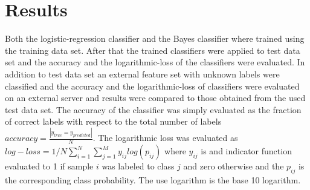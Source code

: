 \documentclass[aps,prb,10pt,twocolumn,groupedaddress]{revtex4-1}
\begin{document}
\section{Results}
\label{sec:results}
Both the logistic-regression classifier and the Bayes classifier where trained
using the training data set. After that the trained classifiers were applied to
test data set and the accuracy and the logarithmic-loss of the classifiers were
evaluated. In addition to test data set an external feature set with unknown
labels were classified and the accuracy and the logarithmic-loss of classifiers
were evaluated on an external server and results were compared to those obtained
from the used test data set. The accuracy of the classifier was simply evaluated
as the fraction of correct labels with respect to the total number of labels
$accuracy = \frac{|y_{true}=y_{predicted}|}{N}$. The logarithmic loss was
evaluated as $log-loss = 1/N\sum_{i=1}^N\sum_{j=1}^My_{ij}log(p_{ij})$ where
$y_{ij}$ is and indicator function evaluated to 1 if sample $i$ was labeled to
class $j$ and zero otherwise and the $p_{ij}$ is the corresponding class
probability. The use logarithm  is the base 10 logarithm.
\end{document}
